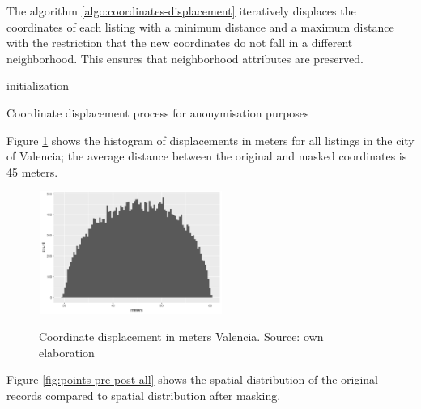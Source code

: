 \documentclass[times,final]{elsarticle}
\begin{document}
The algorithm \ref{algo:coordinates-displacement} iteratively displaces the coordinates of each listing with a minimum distance and a maximum distance with the restriction that the new coordinates do not fall in a different neighborhood. This ensures that neighborhood attributes are preserved.


\begin{algorithm}[!ht]
 initialization\;
 \caption{Coordinate displacement process for anonymisation purposes}
 \label{algo:coordinates-displacement}
\end{algorithm}

Figure \ref{fig:coordinates-displacement} shows the histogram of displacements in meters for all listings in the city of Valencia; the average distance between the original and masked coordinates is 45 meters.

\begin{figure}[!ht]
  \caption{Coordinate displacement in meters Valencia. Source: own elaboration}
  \centering
  \includegraphics[width=6cm, height=4cm]{figures/coordinates/coordinates-valencia}
  \label{fig:coordinates-displacement}
\end{figure}


Figure \ref{fig:points-pre-post-all} shows the spatial distribution of the original records compared to spatial distribution after masking.
\end{document}
